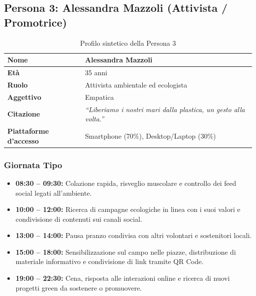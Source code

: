 \documentclass[11pt,a4paper]{article}
\begin{document}
\subsection{Persona 3: Alessandra Mazzoli (Attivista / Promotrice)}

\begin{table}[h!]
\centering
\small
\begin{tabular}{|p{3.5cm}|p{11.5cm}|}
\hline
\textbf{Nome} & Alessandra Mazzoli \\ \hline
\textbf{Età} & 35 anni \\ \hline
\textbf{Ruolo} & Attivista ambientale ed ecologista \\ \hline
\textbf{Aggettivo} & Empatica \\ \hline
\textbf{Citazione} & \textit{``Liberiamo i nostri mari dalla plastica, un gesto alla volta.''} \\ \hline
\textbf{Piattaforme d'accesso} & Smartphone (70\%), Desktop/Laptop (30\%) \\ \hline
\end{tabular}
\caption{Profilo sintetico della Persona 3}
\label{tab:persona3}
\end{table}

\subsubsection{Giornata Tipo}
\begin{itemize}
    \item \textbf{08:30 -- 09:30:} Colazione rapida, risveglio muscolare e controllo dei feed social legati all'ambiente.
    \item \textbf{10:00 -- 12:00:} Ricerca di campagne ecologiche in linea con i suoi valori e condivisione di contenuti sui canali social.
    \item \textbf{13:00 -- 14:00:} Pausa pranzo condivisa con altri volontari e sostenitori locali.
    \item \textbf{15:00 -- 18:00:} Sensibilizzazione sul campo nelle piazze, distribuzione di materiale informativo e condivisione di link tramite QR Code.
    \item \textbf{19:00 -- 22:30:} Cena, risposta alle interazioni online e ricerca di nuovi progetti green da sostenere o promuovere.
\end{itemize}
\end{document}
